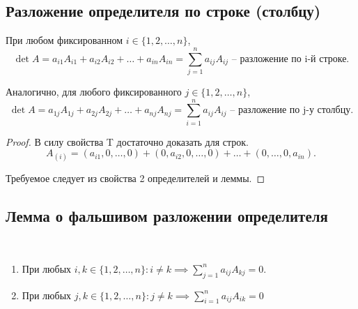 \subsection{Разложение определителя по строке (столбцу)}
\begin{theorem}
    При любом фиксированном $i \in \{1, 2, \dots, n\}$,
    \begin{equation*}
        \det A = a_{i1} A_{i1} + a_{i2} A_{i2} + \dots + a_{in} A_{in} = \sum_{j = 1}^n a_{ij} A_{ij} \text{ -- разложение по i-й строке}
    .\end{equation*}

    Аналогично, для любого фиксированного $j \in \{1, 2, \dots, n\}$,
    \begin{equation*}
        \det A = a_{1j} A_{1j} + a_{2j} A_{2j} + \dots + a_{nj} A_{nj} = \sum_{i = 1}^{n} a_{ij} A_{ij} \text{ -- разложение по j-у столбцу}
    .\end{equation*}
\end{theorem}

\begin{proof}
    В силу свойства T достаточно доказать для строк.
    \begin{equation*}
        A_{(i)} = (a_{i1}, 0, \dots, 0) + (0, a_{i2}, 0, \dots, 0) + \dots + (0, \dots, 0, a_{in})
    .\end{equation*}

    Требуемое следует из свойства 2 определителей и леммы.
\end{proof}


\subsection{Лемма о фальшивом разложении определителя}
\begin{lemma}~
    \begin{enumerate}
    \item
        При любых $i, k \in \{1, 2, \dots, n\} : i \neq k \implies \sum_{j = 1}^n a_{ij} A_{kj} = 0$.
    \item
        При любых $j, k \in \{1, 2, \dots, n\} : j \neq k \implies \sum_{i = 1}^n a_{ij} A_{ik} = 0$
    \end{enumerate}
\end{lemma}


